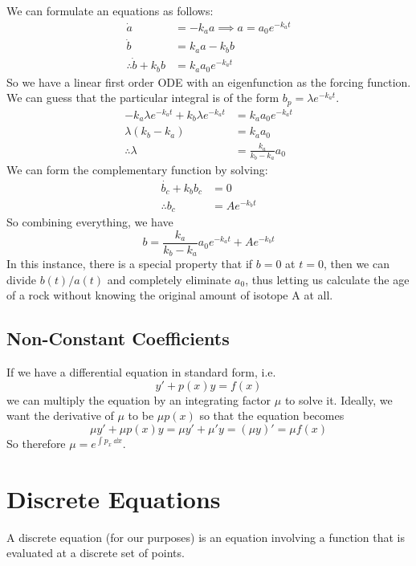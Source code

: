 \documentclass{article}
\begin{document}
	\noindent We can formulate an equations as follows:
	\begin{align*}
		\dot a &= -k_a a \implies a = a_0 e^{-k_a t} \\
		\dot b &= k_a a - k_b b \\
		\therefore \dot b + k_b b &= k_a a_0 e^{-k_a t}
	\end{align*}
	\noindent So we have a linear first order ODE with an eigenfunction as the forcing function. We can guess that the particular integral is of the form $b_p = \lambda e^{-k_a t}$.
	\begin{align*}
		-k_a\lambda e^{-k_a t} + k_b \lambda e^{-k_a t} &= k_a a_0 e^{-k_a t} \\
		\lambda(k_b-k_a) &= k_a a_0 \\
		\therefore \lambda &= \frac{k_a}{k_b - k_a} a_0
	\end{align*}
	We can form the complementary function by solving:
	\begin{align*}
		\dot{b_c} + k_b b_c &= 0 \\
		\therefore b_c &= Ae^{-k_b t}
	\end{align*}
	So combining everything, we have
	\[ b = \frac{k_a}{k_b - k_a} a_0 e^{-k_a t} + Ae^{-k_b t} \]
	In this instance, there is a special property that if $b=0$ at $t=0$, then we can divide $b(t)/a(t)$ and completely eliminate $a_0$, thus letting us calculate the age of a rock without knowing the original amount of isotope A at all.
	
	\subsection{Non-Constant Coefficients}
	If we have a differential equation in standard form, i.e.
	\[ y' + p(x)y = f(x) \]
	we can multiply the equation by an integrating factor $\mu$ to solve it. Ideally, we want the derivative of $\mu$ to be $\mu p(x)$ so that the equation becomes
	\[ \mu y' + \mu p(x) y = \mu y' + \mu' y = (\mu y)' = \mu f(x) \]
	So therefore $\mu = e^{\int p_x\ \dd x}$.
	
	\section{Discrete Equations}
	A discrete equation (for our purposes) is an equation involving a function that is evaluated at a discrete set of points.
	
\end{document}
